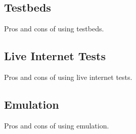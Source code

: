    


\subsection{Testbeds}
Pros and cons of using testbeds.

\subsection{Live Internet Tests}
Pros and cons of using live internet tests.

\subsection{Emulation}
Pros and cons of using emulation.
